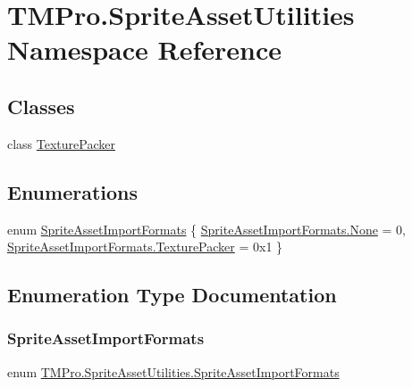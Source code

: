 \hypertarget{namespace_t_m_pro_1_1_sprite_asset_utilities}{}\section{T\+M\+Pro.\+Sprite\+Asset\+Utilities Namespace Reference}
\label{namespace_t_m_pro_1_1_sprite_asset_utilities}
\subsection*{Classes}
\begin{DoxyCompactItemize}
\item 
class \mbox{\hyperlink{class_t_m_pro_1_1_sprite_asset_utilities_1_1_texture_packer}{Texture\+Packer}}
\end{DoxyCompactItemize}
\subsection*{Enumerations}
\begin{DoxyCompactItemize}
\item 
enum \mbox{\hyperlink{namespace_t_m_pro_1_1_sprite_asset_utilities_ae6645ac68f8728971cdb947d693945b3}{Sprite\+Asset\+Import\+Formats}} \{ \mbox{\hyperlink{namespace_t_m_pro_1_1_sprite_asset_utilities_ae6645ac68f8728971cdb947d693945b3a6adf97f83acf6453d4a6a4b1070f3754}{Sprite\+Asset\+Import\+Formats.\+None}} = 0, 
\mbox{\hyperlink{namespace_t_m_pro_1_1_sprite_asset_utilities_ae6645ac68f8728971cdb947d693945b3a1b08667323e2d7b0834100a61682a518}{Sprite\+Asset\+Import\+Formats.\+Texture\+Packer}} = 0x1
 \}
\end{DoxyCompactItemize}


\subsection{Enumeration Type Documentation}
\mbox{\label{namespace_t_m_pro_1_1_sprite_asset_utilities_ae6645ac68f8728971cdb947d693945b3}} 
\subsubsection{\texorpdfstring{SpriteAssetImportFormats}{SpriteAssetImportFormats}}
{\footnotesize\ttfamily enum \mbox{\hyperlink{namespace_t_m_pro_1_1_sprite_asset_utilities_ae6645ac68f8728971cdb947d693945b3}{T\+M\+Pro.\+Sprite\+Asset\+Utilities.\+Sprite\+Asset\+Import\+Formats}}\hspace{0.3cm}{\ttfamily [strong]}}

